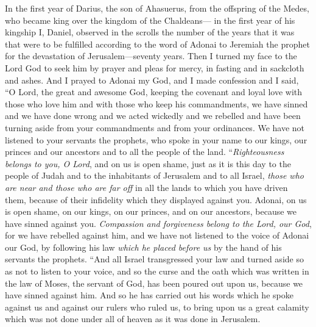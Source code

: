 \begin{biblechapter} %
 In the first year of Darius, the son of Ahasuerus, from the offspring of the Medes, who became king over the kingdom of the Chaldeans—
\verse in the first year of his kingship I, Daniel, observed in the scrolls the number of the years that it was that were to be fulfilled according to the word of Adonai to Jeremiah the prophet for the devastation of Jerusalem—seventy years.
\verse Then I turned my face to the Lord God to seek him by prayer and pleas for mercy, in fasting and in sackcloth and ashes.
\verse And I prayed to Adonai my God, and I made confession and I said, “O Lord, the great and awesome God, keeping the covenant and loyal love with those who love him and with those who keep his commandments,
\verse we have sinned and we have done wrong and we acted wickedly and we rebelled and have been turning aside from your commandments and from your ordinances.
\verse We have not listened to your servants the prophets, who spoke in your name to our kings, our princes and our ancestors and to all the people of the land.
\verse “\textit{Righteousness belongs to you, O Lord}, and on us is open shame, just as it is this day to the people of Judah and to the inhabitants of Jerusalem and to all Israel, \textit{those who are near and those who are far off} in all the lands to which you have driven them, because of their infidelity which they displayed against you.
\verse Adonai, on us is open shame, on our kings, on our princes, and on our ancestors, because we have sinned against you.
\verse \textit{Compassion and forgiveness belong to the Lord, our God}, for we have rebelled against him,
\verse and we have not listened to the voice of Adonai our God, by following his law \textit{which he placed before us} by the hand of his servants the prophets.
\verse “And all Israel transgressed your law and turned aside so as not to listen to your voice, and so the curse and the oath which was written in the law of Moses, the servant of God, has been poured out upon us, because we have sinned against him.
\verse And so he has carried out his words which he spoke against us and against our rulers who ruled us, to bring upon us a great calamity which was not done under all of heaven as it was done in Jerusalem.

\end{biblechapter}
